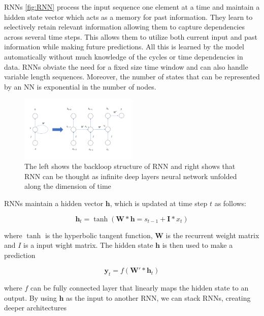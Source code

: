 \documentclass[5p]{elsarticle}
\begin{document}
RNNs \ref{fig:RNN} process the input sequence one element at a time and maintain a hidden
state vector which acts as a memory for past information. They learn to selectively retain relevant information allowing them to capture dependencies across several time steps. This allows them to utilize both current input and past information while making future predictions. All this is learned by the model automatically without much knowledge of the cycles or time dependencies in data. RNNs obviate the need for a fixed size time window and can also handle variable length sequences. Moreover, the number of states that can be represented by an NN is exponential in the number of nodes.

 
\begin{figure}[h]
    \centering
    \includegraphics[width=0.5\textwidth]{RNN.png}
    \caption{The left shows the backloop structure of RNN and right shows that RNN can be thought as infinite deep layers neural network unfolded along the dimension of time}
    \label{fig:RNN can be thought as infinite deep layers neural network along the dimensions of time}
\end{figure}


RNNs maintain a hidden vector $\mathbf h$, which is updated at time step $t$ as follows:

\begin{equation}
	\mathbf h_t = \tanh(\mathbf W * \mathbf h=s_{t-1} + \mathbf I * x_t)
\end{equation}

where $\tanh$ is the hyperbolic tangent function, $\mathbf W$ is the recurrent weight matrix and $I$ is a input wight matrix. The hidden state $\mathbf h$ is then used to make a prediction

\begin{equation}
	\mathbf y_t = f(\mathbf W' * \mathbf h_{t})
\end{equation}

where $f$ can be fully connected layer that linearly maps the hidden state to an output. By using $\mathbf h$ as the input to another RNN, we can stack RNNs, creating deeper architectures 
\end{document}
